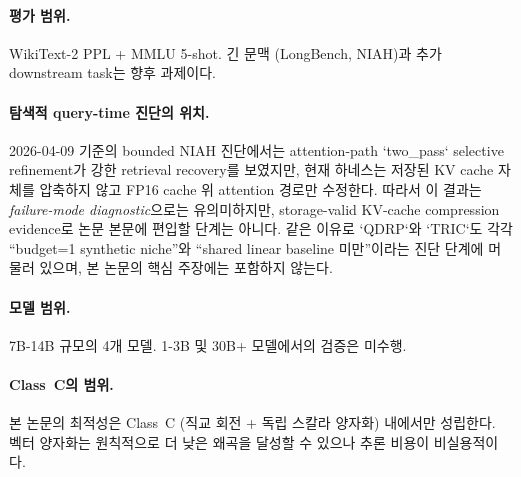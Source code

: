 \paragraph{평가 범위.} WikiText-2 PPL + MMLU 5-shot. 긴 문맥 (LongBench, NIAH)과 추가 downstream task는 향후 과제이다.

\paragraph{탐색적 query-time 진단의 위치.}
2026-04-09 기준의 bounded NIAH 진단에서는 attention-path `two\_pass` selective refinement가 강한 retrieval recovery를 보였지만, 현재 하네스는 저장된 KV cache 자체를 압축하지 않고 FP16 cache 위 attention 경로만 수정한다. 따라서 이 결과는 \emph{failure-mode diagnostic}으로는 유의미하지만, storage-valid KV-cache compression evidence로 논문 본문에 편입할 단계는 아니다. 같은 이유로 `QDRP`와 `TRIC`도 각각 ``budget=1 synthetic niche''와 ``shared linear baseline 미만''이라는 진단 단계에 머물러 있으며, 본 논문의 핵심 주장에는 포함하지 않는다.

\paragraph{모델 범위.} 7B-14B 규모의 4개 모델. 1-3B 및 30B+ 모델에서의 검증은 미수행.

\paragraph{Class~C의 범위.} 본 논문의 최적성은 Class~C (직교 회전 + 독립 스칼라 양자화) 내에서만 성립한다. 벡터 양자화는 원칙적으로 더 낮은 왜곡을 달성할 수 있으나 추론 비용이 비실용적이다.
